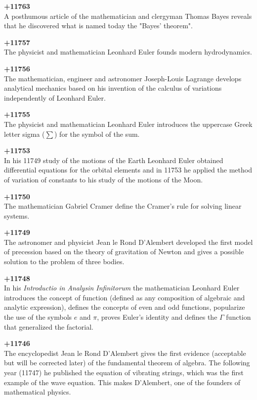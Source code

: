 \textbf{+11763}\\
A posthumous article of the mathematician and clergyman Thomas Bayes reveals that he discovered what is named today the "Bayes' theorem".

\textbf{+11757}\\
The physicist and mathematician Leonhard Euler founds modern hydrodynamics.

\textbf{+11756}\\
The mathematician, engineer and astronomer Joseph-Louis Lagrange develops analytical mechanics based on his invention of the calculus of variations independently of Leonhard Euler.

\textbf{+11755}\\
The physicist and mathematician Leonhard Euler introduces the uppercase Greek letter sigma ($\sum$) for the symbol of the sum.

\textbf{+11753}\\
In his 11749 study of the motions of the Earth Leonhard Euler obtained differential equations for the orbital elements and in 11753 he applied the method of variation of constants to his study of the motions of the Moon.

\textbf{+11750}\\
The mathematician Gabriel Cramer define the Cramer's rule for solving linear systems.

\textbf{+11749}\\
The astronomer and physicist Jean le Rond D'Alembert developed the first model of precession based on the theory of gravitation of Newton and gives a possible solution to the problem of three bodies.

\textbf{+11748}\\
In his \textit{Introductio in Analysin Infinitorum} the mathematician Leonhard Euler introduces the concept of function (defined as any composition of algebraic and analytic expression), defines the concepts of even and odd functions, popularize the use of the symbols $e$ and $\pi$, proves Euler's identity and defines the $\Gamma$ function that generalized the factorial.

\textbf{+11746}\\
The encyclopedist Jean le Rond D'Alembert gives the first evidence (acceptable but will be corrected later) of the fundamental theorem of algebra. The following year (11747) he published the equation of vibrating strings, which was the first example of the wave equation. This makes D'Alembert, one of the founders of mathematical physics.

